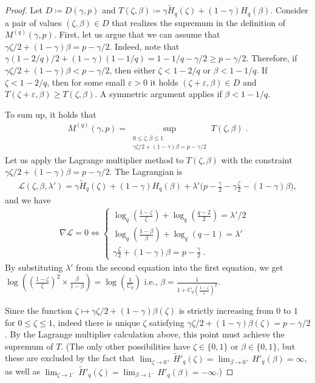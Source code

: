 \documentclass{article}
\newcommand{\Htilde}{\tilde{H}}
\newcommand{\eps}{\varepsilon}
\theoremstyle{plain}
\theoremstyle{plain}
\theoremstyle{plain}
\theoremstyle{plain}
\theoremstyle{plain}
\theoremstyle{plain}
\theoremstyle{plain}
\theoremstyle{plain}
\theoremstyle{plain}
\theoremstyle{plain}
\theoremstyle{remark}
\theoremstyle{remark}
\theoremstyle{remark}
\theoremstyle{plain}
\begin{document}
\begin{proof}
Let $D\coloneqq D(\gamma,p)$
and $T(\zeta,\beta)\coloneqq
\gamma\Htilde_q(\zeta)+(1-\gamma)H_q(\beta)$.
Consider a pair of values $(\zeta,\beta)\in D$
that realizes the supremum in the definition
of $M^{(q)}(\gamma,p)$.
First, let us argue that we can assume that
$\gamma\zeta/2+(1-\gamma)\beta=p-\gamma/2$.
Indeed, note that
$\gamma(1-2/q)/2+(1-\gamma)(1-1/q)=1-1/q-\gamma/2
\ge p-\gamma/2$. Therefore, if
$\gamma\zeta/2+(1-\gamma)\beta<p-\gamma/2$,
then either $\zeta<1-2/q$ or $\beta<1-1/q$.
If $\zeta<1-2/q$, then for some small $\eps>0$
it holds $(\zeta+\eps,\beta)\in D$
and $T(\zeta+\eps,\beta)\ge T(\zeta,\beta)$.
A symmetric argument applies if $\beta<1-1/q$.

To sum up, it holds that
\begin{align}
\label{eq:M_achive_at_sphere}
    M^{(q)}(\gamma,p)=\sup_{\substack{0\le \zeta,\beta\le 1\\
    \gamma\zeta/2+(1-\gamma)\beta=p-\gamma/2}} T(\zeta,\beta)\;.
\end{align}
Let us apply the Lagrange multiplier method 
to $T(\zeta,\beta)$
with the constraint
$\gamma\zeta/2+(1-\gamma)\beta=p-\gamma/2$.
The Lagrangian is 
    \begin{align*}
        \mathcal{L}(\zeta,\beta,\lambda')= \gamma\tilde{H}_q(\zeta)+(1-\gamma)H_q(\beta)+\lambda'\Big(p-\frac{\gamma}{2}-\gamma\frac{\zeta}{2}-(1-\gamma)\beta\Big),
    \end{align*}
and we have 
    \begin{align*}
        \nabla \mathcal{L}=0\iff\begin{cases}
            \log_q(\frac{1-\zeta}{\zeta})+\log_q(\frac{q-2}{2})=\lambda'/2 &\\ \log_q(\frac{1-\beta}{\beta})+\log_q(q-1)=\lambda' &\\ \gamma\frac{\zeta}{2}+(1-\gamma)\beta=p-\frac{\gamma}{2}\;.
        \end{cases}
    \end{align*}
    By substituting $\lambda'$ from the second equation into the first equation, we get $\log\left((\frac{1-\zeta}{\zeta})^2\times\frac{\beta}{1-\beta}\right)=\log(\frac{1}{C_q})$ i.e., $\beta=\frac{1}{1+C_q(\frac{1-\zeta}{\zeta})^2}$.
    
    Since the function
    $\zeta\mapsto \gamma\zeta/2+(1-\gamma)\beta(\zeta)$
    is strictly increasing from 0 to $1$ for
    $0\le\zeta\le 1$, indeed there is unique
    $\zeta$ satisfying 
    $\gamma\zeta/2+(1-\gamma)\beta(\zeta)=p-\gamma/2$. By the Lagrange multiplier
    calculation above, this point must achieve
    the supremum of $T$. (The only other possibilities
    have $\zeta\in\{0,1\}$ or
    $\beta\in\{0,1\}$, but these
    are excluded by the fact that
    $\lim_{\zeta\to 0^+}\Htilde'_q(\zeta)
    =\lim_{\beta\to 0^+}H'_q(\beta)=\infty$,
    as well as 
    $\lim_{\zeta\to 1^-}\Htilde'_q(\zeta)
    =\lim_{\beta\to 1^-}H'_q(\beta)=-\infty$.)
\end{proof}
\end{document}
